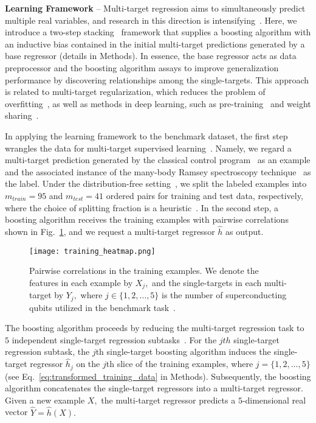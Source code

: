 \documentclass[aps,twocolumn,superscriptaddress,floatfix,preprintnumbers,showkeys]{revtex4}
\begin{document}
\textbf{Learning Framework} -- Multi-target regression aims to simultaneously predict multiple real variables, and research in this direction is intensifying~\cite{Borchani_2015, Waegeman_2019}. Here, we introduce a two-step stacking~\cite{Wolpert_1992, Breiman_1996, Breiman_1997_2, Borchani_2015, Waegeman_2019} framework that supplies a boosting algorithm with an inductive bias contained in the initial multi-target predictions generated by a base regressor (details in Methods). In essence, the base regressor acts as data preprocessor and the boosting algorithm assays to improve generalization performance by discovering relationships among the single-targets. This approach is related to multi-target regularization, which reduces the problem of overfitting~\cite{Breiman_1997_2, Borchani_2015, Waegeman_2019}, as well as methods in deep learning, such as pre-training~\cite{Erhan_2010} and weight sharing~\cite{Caruana_1997}. 

In applying the learning framework to the benchmark dataset, the first step wrangles the data for multi-target supervised learning~\cite{Borchani_2015, Waegeman_2019}. Namely, we regard a multi-target prediction generated by the classical control program~\cite{Roushan_2017, Neill_2018, Chiaro_2019} as an example and the associated instance of the many-body Ramsey spectroscopy technique~\cite{Roushan_2017} as the label. Under the distribution-free setting~\cite{Haussler_1992, Kearns_1994_1, Kearns_1994_2, Friedman_2001, Friedman_2003, Hastie_2009}, we split the labeled examples into $m_{train}=95$ and $m_{test}=41$ ordered pairs for training and test data, respectively, where the choice of splitting fraction is a heuristic~\cite{Ng_2020, Hastie_2009}. In the second step, a boosting algorithm receives the training examples with pairwise correlations shown in Fig.~\ref{fig:heatmap}, and we request a multi-target regressor $\hat{h}$ as output. 
\begin{figure}
\centering
\texttt{[image: training\_heatmap.png]}
\caption{Pairwise correlations in the training examples. We denote the features in each example by $X_{j},$ and the single-targets in each multi-target by $Y_{j},$ where $j \in \{1,2,\dots,5\}$ is the number of superconducting qubits utilized in the benchmark task~\cite{Roushan_2017, Neill_2018, Chiaro_2019}.}
\label{fig:heatmap}
\end{figure}
The boosting algorithm proceeds by reducing the multi-target regression task to $5$ independent single-target regression subtasks~\cite{Borchani_2015, Waegeman_2019}. For the $jth$ single-target regression subtask, the $j$th single-target boosting algorithm induces the single-target regressor $\hat{h}_{j}$ on the $j$th slice of the training examples, where $j=\{1,2,\dots,5\}$ (see Eq.~\ref{eq:transformed_training_data} in Methods). Subsequently, the boosting algorithm concatenates the single-target regressors into a multi-target regressor. Given a new example $X,$ the multi-target regressor predicts a $5$-dimensional real vector $\hat{Y} = \hat{h}(X).$ 
\end{document}
